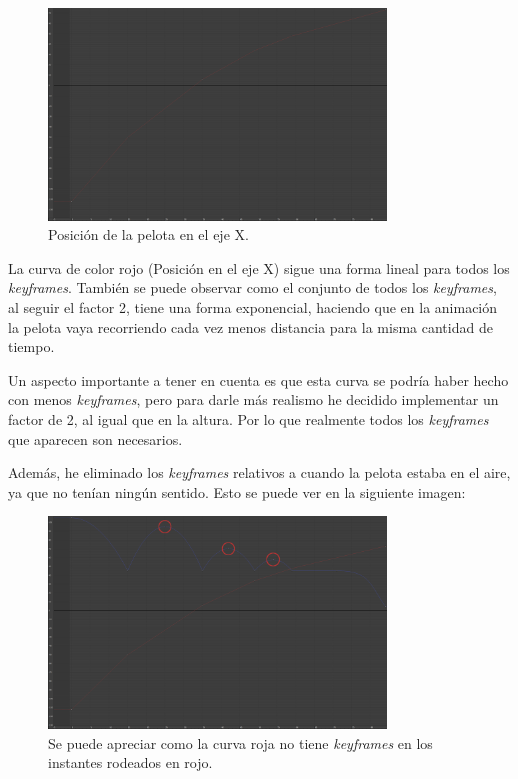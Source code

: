 \documentclass{article}
\begin{document}
\begin{figure}[H]
    \centering
    \includegraphics[width=0.8\textwidth]{imagenes/Ejercicio3/corregidas/curvas/red.png}
    \caption{Posición de la pelota en el eje X.}
\end{figure}

La curva de color rojo (Posición en el eje X) sigue una forma lineal para todos los \textit{keyframes}. También se puede observar como el conjunto de todos los \textit{keyframes}, al seguir el factor 2, tiene una forma exponencial, haciendo que en la animación la pelota vaya recorriendo cada vez menos distancia para la misma cantidad de tiempo.

\bigskip

Un aspecto importante a tener en cuenta es que esta curva se podría haber hecho con menos \textit{keyframes}, pero para darle más realismo he decidido implementar un factor de 2, al igual que en la altura. Por lo que realmente todos los \textit{keyframes} que aparecen son necesarios.

\newpage

Además, he eliminado los \textit{keyframes} relativos a cuando la pelota estaba en el aire, ya que no tenían ningún sentido. Esto se puede ver en la siguiente imagen:

\begin{figure}[H]
    \centering
    \includegraphics[width=0.8\textwidth]{imagenes/Ejercicio3/corregidas/curvas/both.png}
    \caption{Se puede apreciar como la curva roja no tiene \textit{keyframes} en los instantes rodeados en rojo.}
\end{figure}
\end{document}
